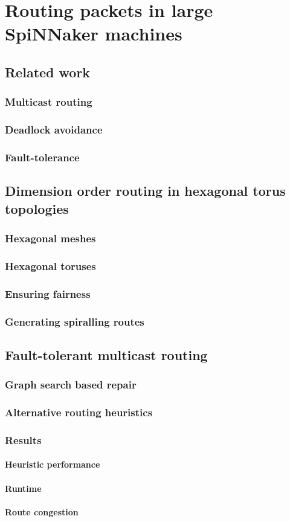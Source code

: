 \chapter{Routing packets in large SpiNNaker machines}

\section{Related work}
	\subsection{Multicast routing}
	\subsection{Deadlock avoidance}
	\subsection{Fault-tolerance}

\section{Dimension order routing in hexagonal torus topologies}
	\subsection{Hexagonal meshes}
	\subsection{Hexagonal toruses}
	\subsection{Ensuring fairness}
	\subsection{Generating spiralling routes}

\section{Fault-tolerant multicast routing}
	\subsection{Graph search based repair}
	\subsection{Alternative routing heuristics}
	\subsection{Results}
		\subsubsection{Heuristic performance}
		\subsubsection{Runtime}
		\subsubsection{Route congestion}

